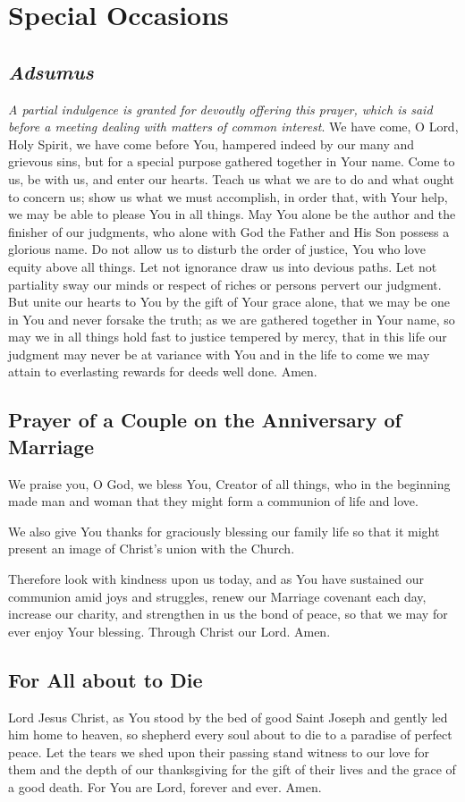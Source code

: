 \documentclass[12pt]{article}
\newcommand{\prayersection}[1]{\section{#1}}
\newcommand{\prayertitle}[1]{\subsection{#1}}
\newcommand{\indulgencedprayertitle}[1]{\prayertitle{#1 \protect\kreuz}}
\newcommand{\foreign}[1]{\textsl{#1}}
\newcommand{\note}[1]{{\small{\textsl{#1}}}\newline}
\begin{document}
\prayersection{Special Occasions}
\indulgencedprayertitle{\foreign{Adsumus}}
\note{A partial indulgence is granted for devoutly offering this prayer, which is said before a meeting dealing with matters of common interest}.
We have come, O Lord, Holy Spirit, we have come before You, hampered indeed by our many and grievous sins, but for a special purpose gathered together in Your name.
Come to us, be with us, and enter our hearts.
Teach us what we are to do and what ought to concern us;
show us what we must accomplish, in order that, with Your help, we may be able to please You in all things.
May You alone be the author and the finisher of our judgments, who alone with God the Father and His Son possess a glorious name.
Do not allow us to disturb the order of justice, You who love equity above all things.
Let not ignorance draw us into devious paths.
Let not partiality sway our minds or respect of riches or persons pervert our judgment.
But unite our hearts to You by the gift of Your grace alone, that we may be one in You and never forsake the truth;
as we are gathered together in Your name, so may we in all things hold fast to justice tempered by mercy, that in this life our judgment may never be at variance with You and in the life to come we may attain to everlasting rewards for deeds well done.
Amen.

\prayertitle{Prayer of a Couple on the Anniversary of Marriage}
We praise you, O God, we bless You, Creator of all things, who in the beginning made man and woman that they might form a communion of life and love.

We also give You thanks for graciously blessing our family life so that it might present an image of Christ's union with the Church.

Therefore look with kindness upon us today, and as You have sustained our communion amid joys and struggles, renew our Marriage covenant each day, increase our charity, and strengthen in us the bond of peace, so that we may for ever enjoy Your blessing.
Through Christ our Lord. Amen.

\prayertitle{For All about to Die}
Lord Jesus Christ, as You stood by the bed of good Saint Joseph and gently led him home to heaven, so shepherd every soul about to die to a paradise of perfect peace.
Let the tears we shed upon their passing stand witness to our love for them and the depth of our thanksgiving for the gift of their lives and the grace of a good death.
For You are Lord, forever and ever.
Amen.
\end{document}
